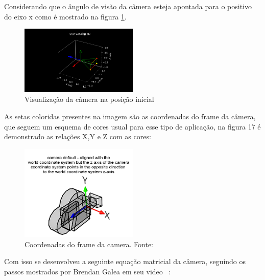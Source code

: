 Considerando que o ângulo de visão da câmera esteja apontada para o positivo do eixo x como é mostrado na figura \ref{fig:posicao_inicial_camera}.

\begin{figure}[h]
    \centering
    \includegraphics[width=0.5\textwidth]{images/posicao_inicial_camera.png}
    \caption{Visualização da câmera na posição inicial}
    \label{fig:posicao_inicial_camera}
\end{figure}

As setas coloridas presentes na imagem são as coordenadas do frame da câmera, que seguem um esquema de cores usual para esse tipo de aplicação, na figura 17 é demonstrado as relações X,Y e Z com as cores:



\begin{figure}[h]
    \centering
    \includegraphics[width=0.5\textwidth]{images/coordenadas.png}
    \caption{Coordenadas do frame da camera. Fonte: ~\cite[]{the_free_dictionary}}
    \label{fig:coordenadas}
\end{figure}


Com isso se desenvolveu a seguinte equação matricial da câmera, seguindo os passos mostrados por Brendan Galea em seu video ~\cite[]{Galea}:

